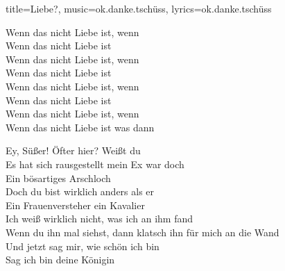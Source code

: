 \begin{song}{title={Liebe?}, music={ok.danke.tschüss}, lyrics={ok.danke.tschüss}}
\begin{bridge}
    Wenn das nicht Liebe ist, wenn \\
    Wenn das nicht Liebe ist \\
    Wenn das nicht Liebe ist, wenn \\
    Wenn das nicht Liebe ist \\
    Wenn das nicht Liebe ist, wenn \\
    Wenn das nicht Liebe ist \\
    Wenn das nicht Liebe ist, wenn \\
    Wenn das nicht Liebe ist was dann
\end{bridge}

\begin{outro}
    Ey, Süßer! Öfter hier? Weißt du \\
    Es hat sich rausgestellt mein Ex war doch \\
    Ein bösartiges Arschloch \\
    Doch du bist wirklich anders als er \\
    Ein Frauenversteher ein Kavalier \\
    Ich weiß wirklich nicht, was ich an ihm fand \\
    Wenn du ihn mal siehst, dann klatsch ihn für mich an die Wand \\
    Und jetzt sag mir, wie schön ich bin \\
    Sag ich bin deine Königin
\end{outro}

\end{song}